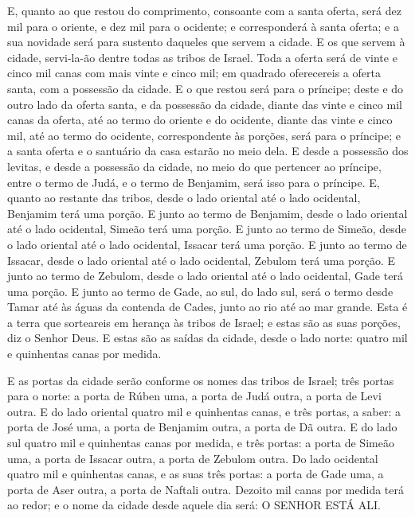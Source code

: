 E, quanto ao que restou do comprimento, consoante com a santa
oferta, será dez mil para o oriente, e dez mil para o ocidente; e
corresponderá à santa oferta; e a sua novidade será para sustento
daqueles que servem a cidade. E os que servem à cidade,
servi-la-ão dentre todas as tribos de Israel. Toda a oferta
será de vinte e cinco mil canas com mais vinte e cinco mil; em
quadrado oferecereis a oferta santa, com a possessão da cidade.
E o que restou será para o príncipe; deste e do outro lado da
oferta santa, e da possessão da cidade, diante das vinte e cinco mil
canas da oferta, até ao termo do oriente e do ocidente, diante das
vinte e cinco mil, até ao termo do ocidente, correspondente às
porções, será para o príncipe; e a santa oferta e o santuário da
casa estarão no meio dela. E desde a possessão dos levitas, e
desde a possessão da cidade, no meio do que pertencer ao príncipe,
entre o termo de Judá, e o termo de Benjamim, será isso para o
príncipe. E, quanto ao restante das tribos, desde o lado
oriental até o lado ocidental, Benjamim terá uma porção. E
junto ao termo de Benjamim, desde o lado oriental até o lado
ocidental, Simeão terá uma porção. E junto ao termo de
Simeão, desde o lado oriental até o lado ocidental, Issacar terá uma
porção. E junto ao termo de Issacar, desde o lado oriental
até o lado ocidental, Zebulom terá uma porção. E junto ao
termo de Zebulom, desde o lado oriental até o lado ocidental, Gade
terá uma porção. E junto ao termo de Gade, ao sul, do lado
sul, será o termo desde Tamar até às águas da contenda de Cades,
junto ao rio até ao mar grande. Esta é a terra que sorteareis
em herança às tribos de Israel; e estas são as suas porções, diz o
Senhor Deus. E estas são as saídas da cidade, desde o lado
norte: quatro mil e quinhentas canas por medida.

E as portas da cidade serão conforme os nomes das tribos de
Israel; três portas para o norte: a porta de Rúben uma, a porta de
Judá outra, a porta de Levi outra. E do lado oriental quatro
mil e quinhentas canas, e três portas, a saber: a porta de José uma,
a porta de Benjamim outra, a porta de Dã outra. E do lado sul
quatro mil e quinhentas canas por medida, e três portas: a porta de
Simeão uma, a porta de Issacar outra, a porta de Zebulom outra.
Do lado ocidental quatro mil e quinhentas canas, e as suas
três portas: a porta de Gade uma, a porta de Aser outra, a porta de
Naftali outra. Dezoito mil canas por medida terá ao redor; e
o nome da cidade desde aquele dia será: O SENHOR ESTÁ ALI.

